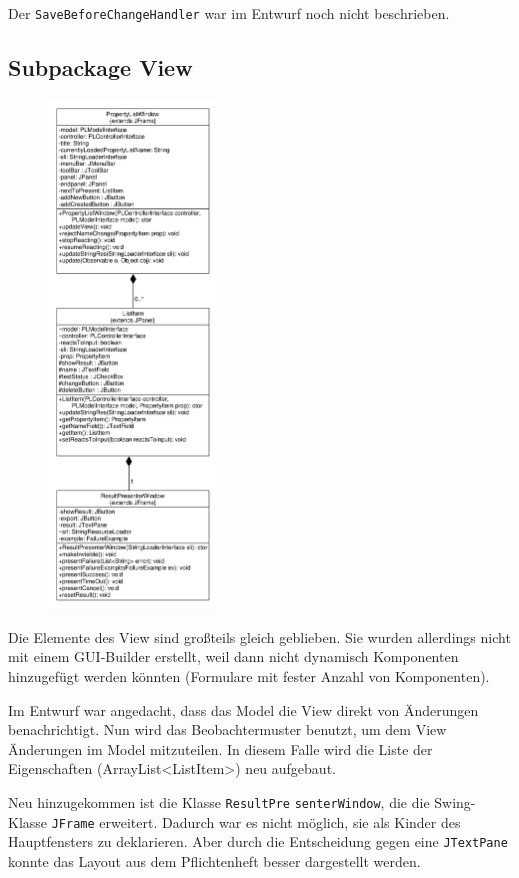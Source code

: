 \documentclass[a4paper]{scrreprt}
\begin{document}
Der \verb!SaveBeforeChangeHandler! war im Entwurf noch nicht beschrieben.

\subsection{Subpackage View}
\begin{figure}
\includegraphics[width=0.4\textwidth]{PropertyListView.pdf}
\end{figure}
Die Elemente des View sind großteils gleich geblieben. Sie wurden allerdings nicht mit einem GUI-Builder erstellt, weil dann nicht dynamisch Komponenten hinzugefügt werden könnten (Formulare mit fester Anzahl von Komponenten).

Im Entwurf war angedacht, dass das Model die View direkt von Änderungen benachrichtigt. Nun wird das Beobachtermuster benutzt, um dem View Änderungen im Model mitzuteilen. In diesem Falle wird die Liste der Eigenschaften (ArrayList<ListItem>) neu aufgebaut.

Neu hinzugekommen ist die Klasse \verb!ResultPre! \verb!senterWindow!, die die Swing-Klasse \verb!JFrame! erweitert. Dadurch war es nicht möglich, sie als Kinder des Hauptfensters zu deklarieren. Aber durch die Entscheidung gegen eine \verb!JTextPane! konnte das Layout aus dem Pflichtenheft besser dargestellt werden.
\end{document}
